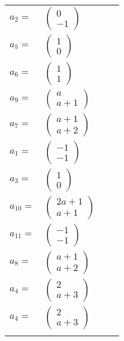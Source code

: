 \documentclass[1p]{elsarticle_modified}
\theoremstyle{definition}
\begin{document}
\begin{tabular}{m{7pt} m{180pt} m{7pt} m{180pt} }
\flushright $a_{2}=$&$\begin{pmatrix}0\\-1\end{pmatrix}$ \\
\flushright $a_{5}=$&$\begin{pmatrix}1\\0\end{pmatrix}$ \\
\flushright $a_{6}=$&$\begin{pmatrix}1\\1\end{pmatrix}$ \\
\flushright $a_{9}=$&$\begin{pmatrix}a\\a+1\end{pmatrix}$ \\
\flushright $a_{7}=$&$\begin{pmatrix}a+1\\a+2\end{pmatrix}$ \\
\flushright $a_{1}=$&$\begin{pmatrix}-1\\-1\end{pmatrix}$ \\
\flushright $a_{3}=$&$\begin{pmatrix}1\\0\end{pmatrix}$ \\
\flushright $a_{10}=$&$\begin{pmatrix}2 a+1\\a+1\end{pmatrix}$ \\
\flushright $a_{11}=$&$\begin{pmatrix}-1\\-1\end{pmatrix}$ \\
\flushright $a_{8}=$&$\begin{pmatrix}a+1\\a+2\end{pmatrix}$ \\
\flushright $a_{4}=$&$\begin{pmatrix}2\\a+3\end{pmatrix}$\\ \flushright $a_{4}=$&$\begin{pmatrix}2\\a+3\end{pmatrix}$\\&\end{tabular}
\end{document}
